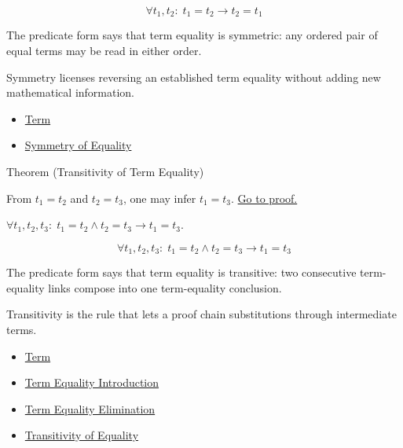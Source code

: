 \begin{remark*}
\[
  \forall t_1, t_2:\; t_1=t_2 \to t_2=t_1
\]
\end{remark*}



\begin{remark*}[Interpretation]
The predicate form says that term equality is symmetric: any ordered pair of
equal terms may be read in either order.

Symmetry licenses reversing an established term equality without adding new
mathematical information.
\end{remark*}

\begin{dependencies}
\begin{itemize}
  \item \hyperref[def:term]{Term}
  \item \hyperref[thm:axiomatic-equality-symmetry]{Symmetry of Equality}
\end{itemize}
\end{dependencies}

\begin{theorembox}{Theorem (Transitivity of Term Equality)}
\begin{theorem}\label{thm:eq-trans}
From $t_1 = t_2$ and $t_2 = t_3$, one may infer $t_1 = t_3$.
\hyperref[prf:eq-trans]{Go to proof.}
\end{theorem}
\end{theorembox}
\begin{remark*}
$\forall t_1, t_2, t_3:\; t_1=t_2 \wedge t_2=t_3 \to t_1=t_3$.
\end{remark*}

\begin{remark*}
\[
  \forall t_1, t_2, t_3:\; t_1=t_2 \wedge t_2=t_3 \to t_1=t_3
\]
\end{remark*}



\begin{remark*}[Interpretation]
The predicate form says that term equality is transitive: two consecutive
term-equality links compose into one term-equality conclusion.

Transitivity is the rule that lets a proof chain substitutions through
intermediate terms.
\end{remark*}

\begin{dependencies}
\begin{itemize}
  \item \hyperref[def:term]{Term}
  \item \hyperref[def:eq-refl]{Term Equality Introduction}
  \item \hyperref[def:eq-elim]{Term Equality Elimination}
  \item \hyperref[thm:axiomatic-equality-transitivity]{Transitivity of Equality}
\end{itemize}
\end{dependencies}

